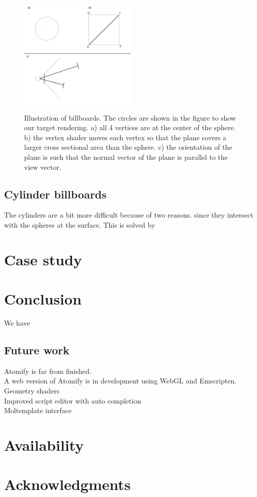 \documentclass[aps,pre,twocolumn,letterpaper,floatfix]{revtex4}
\begin{document}
\begin{figure}
	\centering
	\includegraphics[width=0.5\textwidth]{spherebillboards.png}
	\caption{Illustration of billboards. The circles are shown in the figure to show our target rendering. a) all 4 vertices are at the center of the sphere. b) the vertex shader moves each vertex so that the plane covers a larger cross sectional area than the sphere. c) the orientation of the plane is such that the normal vector of the plane is parallel to the view vector. }
	\label{fig:billboards}
\end{figure}



\subsection{Cylinder billboards}
The cylinders are a bit more difficult because of two reasons. 
since they intersect with the spheres at the surface. This is solved by 

\section{Case study}

\section{Conclusion}
We have

\subsection{Future work}
Atomify is far from finished.\\
A web version of Atomify is in development using WebGL and Emscripten. \\
Geometry shaders \\
Improved script editor with auto completion \\
Moltemplate interface \\

\section{Availability}

\section{Acknowledgments}



\end{document}
